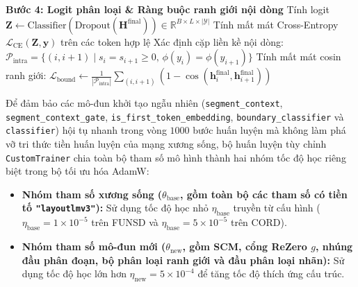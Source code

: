 \begin{algorithm}[htbp]
\BlankLine
\textbf{Bước 4: Logit phân loại \& Ràng buộc ranh giới nội dòng}\;
Tính logit $\mathbf{Z} \leftarrow \text{Classifier}(\text{Dropout}(\mathbf{H}^{\text{final}})) \in \mathbb{R}^{B \times L \times |\mathcal{Y}|}$\;
Tính mất mát Cross-Entropy $\mathcal{L}_{\text{CE}}(\mathbf{Z}, \mathbf{y})$ trên các token hợp lệ\;
Xác định cặp liền kề nội dòng: $\mathcal{P}_{\text{intra}} = \{(i, i+1) \mid s_i = s_{i+1} \ge 0, \, \phi(y_i) = \phi(y_{i+1})\}$\;
Tính mất mát cosin ranh giới: $\mathcal{L}_{\text{bound}} \leftarrow \frac{1}{|\mathcal{P}_{\text{intra}}|} \sum_{(i,i+1)} (1 - \cos(\mathbf{h}_i^{\text{final}}, \mathbf{h}_{i+1}^{\text{final}}))$\;
\;
\caption{Quy trình lan truyền tiến và huấn luyện kết hợp Structure-Aware LayoutLMv3}
\label{alg:proposed_training}
\end{algorithm}

Để đảm bảo các mô-đun khởi tạo ngẫu nhiên (\texttt{segment\_}\allowbreak\texttt{context}, \texttt{segment\_}\allowbreak\texttt{context\_}\allowbreak\texttt{gate}, \texttt{is\_first\_}\allowbreak\texttt{token\_}\allowbreak\texttt{embedding}, \texttt{boundary\_}\allowbreak\texttt{classifier} và \texttt{classifier}) hội tụ nhanh trong vòng $1000$ bước huấn luyện mà không làm phá vỡ tri thức tiền huấn luyện của mạng xương sống, bộ huấn luyện tùy chỉnh \texttt{CustomTrainer} chia toàn bộ tham số mô hình thành hai nhóm tốc độ học riêng biệt trong bộ tối ưu hóa AdamW:
\begin{itemize}
    \item \textbf{Nhóm tham số xương sống ($\theta_{\text{base}}$, gồm toàn bộ các tham số có tiền tố \texttt{"layoutlmv3"}):} Sử dụng tốc độ học nhỏ $\eta_{\text{base}}$ truyền từ cấu hình ($\eta_{\text{base}} = 1\times 10^{-5}$ trên FUNSD và $\eta_{\text{base}} = 5\times 10^{-5}$ trên CORD).
    \item \textbf{Nhóm tham số mô-đun mới ($\theta_{\text{new}}$, gồm SCM, cổng ReZero $g$, nhúng đầu phân đoạn, bộ phân loại ranh giới và đầu phân loại nhãn):} Sử dụng tốc độ học lớn hơn $\eta_{\text{new}} = 5\times 10^{-4}$ để tăng tốc độ thích ứng cấu trúc.
\end{itemize}

